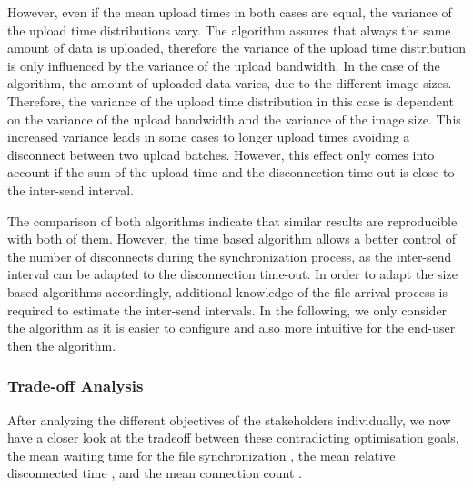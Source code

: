 However, even if the mean upload times in both cases are equal, the variance of the upload time distributions vary.
The \algosize algorithm assures that always the same amount of data is uploaded, therefore the variance of the upload time distribution is only influenced by the variance of the upload bandwidth.
In the case of the \algointerval algorithm, the amount of uploaded data varies, due to the different image sizes.
Therefore, the variance of the upload time distribution in this case is dependent on the variance of the upload bandwidth and the variance of the image size.
This increased variance leads in some cases to longer upload times avoiding a disconnect between two upload batches.
However, this effect only comes into account if the sum of the upload time and the disconnection time-out is close to the inter-send interval.

The comparison of both algorithms indicate that similar results are reproducible with both of them.
However, the time based algorithm allows a better control of the number of disconnects during the synchronization process, as the inter-send interval can be adapted to the disconnection time-out. 
In order to adapt the size based algorithms accordingly, additional knowledge of the file arrival process is required to estimate the inter-send intervals.
In the following, we only consider the \algointerval algorithm as it is easier to configure and also more intuitive for the end-user then the \algosize algorithm. 

\subsubsection*{Trade-off Analysis}\label{sec:application:cloud_file_synchronisation:numerical_evaluation:trade_off_analysis}

After analyzing the different objectives of the stakeholders individually, we now have a closer look at the tradeoff between these contradicting optimisation goals, the mean waiting time for the file synchronization \sojournTime, the mean relative disconnected time \relativeDisconnectedTime, and the mean connection count \connectionCount.

